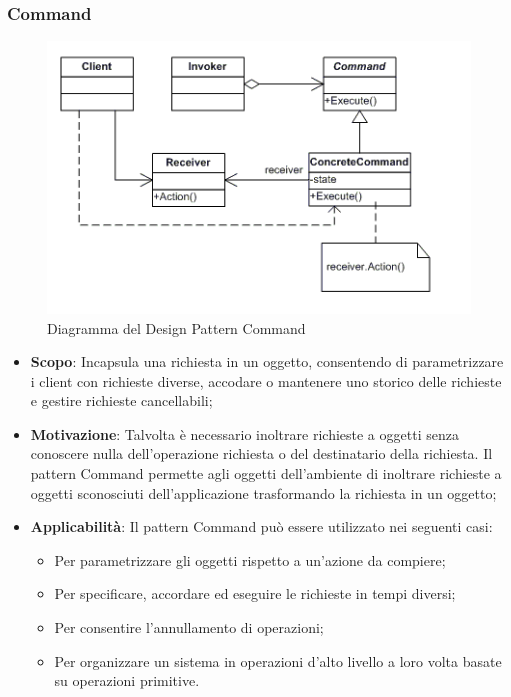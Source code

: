 		\subsubsection{Command}	
		\begin{figure}[H]
		\centering
		\includegraphics[width=0.6\linewidth]{GraficiAppendici/command.png}
		\caption{Diagramma del Design Pattern Command}
	\end{figure}
		\begin{itemize}
		\item \textbf{Scopo}: Incapsula una richiesta in un oggetto, consentendo di parametrizzare i
client con richieste diverse, accodare o mantenere uno storico delle richieste e gestire richieste cancellabili;
		\item \textbf{Motivazione}: Talvolta è necessario inoltrare richieste a oggetti senza conoscere
nulla dell’operazione richiesta o del destinatario della richiesta. Il pattern Command permette agli oggetti dell’ambiente di inoltrare richieste a oggetti sconosciuti dell’applicazione trasformando la richiesta in un oggetto;
		\item \textbf{Applicabilità}: Il pattern Command può essere utilizzato nei seguenti casi:
		\begin{itemize}
		\item Per parametrizzare gli oggetti rispetto a un’azione da compiere;
		\item Per specificare, accordare ed eseguire le richieste in tempi diversi;
		\item Per consentire l’annullamento di operazioni;
		\item Per organizzare un sistema in operazioni d’alto livello a loro volta basate su operazioni primitive.
		\end{itemize}

		\end{itemize}
		
	